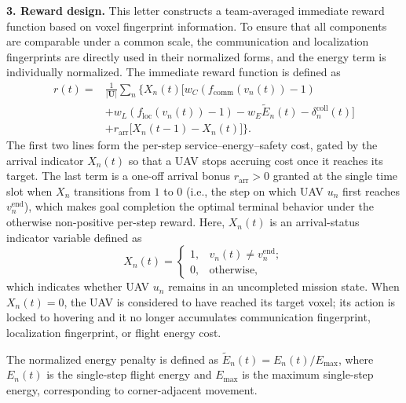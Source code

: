 \documentclass[lettersize,journal]{IEEEtran}
\begin{document}
\noindent\textbf{3. Reward design.}
This letter constructs a team-averaged immediate reward function based on voxel fingerprint information. To ensure that all components are comparable under a common scale, the communication and localization fingerprints are directly used in their normalized forms, and the energy term is individually normalized. The immediate reward function is defined as
\begin{equation}
\begin{aligned}
r(t)=&\frac{1}{|\mathbf{U}|}\sum_{n}\Big\{X_n(t)\Big[
 w_C(f_{\mathrm{comm}}(v_n(t))-1)\\
&+w_L(f_{\mathrm{loc}}(v_n(t))-1)-w_E\widetilde{E}_n(t)-\delta_n^{\mathrm{coll}}(t)\Big]\\
&+r_{\mathrm{arr}}\big[X_n(t-1)-X_n(t)\big]\Big\}.
\end{aligned}
\end{equation}
The first two lines form the per-step service--energy--safety cost, gated by the arrival indicator $X_n(t)$ so that a UAV stops accruing cost once it reaches its target. The last term is a one-off arrival bonus $r_{\mathrm{arr}}>0$ granted at the single time slot when $X_n$ transitions from $1$ to $0$ (i.e., the step on which UAV $u_n$ first reaches $v_n^{\mathrm{end}}$), which makes goal completion the optimal terminal behavior under the otherwise non-positive per-step reward.
Here, $X_n(t)$ is an arrival-status indicator variable defined as
\begin{equation}
X_n(t)=
\begin{cases}
1, & v_n(t)\neq v_n^{\mathrm{end}};\\
0, & \mathrm{otherwise},
\end{cases}
\end{equation}
which indicates whether UAV $u_n$ remains in an uncompleted mission state. When $X_n(t)=0$, the UAV is considered to have reached its target voxel; its action is locked to hovering and it no longer accumulates communication fingerprint, localization fingerprint, or flight energy cost.

The normalized energy penalty is defined as 
$\tilde{E}_n(t)=E_n(t)/E_{\max}$, where $E_n(t)$ is the single-step flight energy and 
$E_{\max}$ is the maximum single-step energy, corresponding to corner-adjacent movement.
\end{document}
